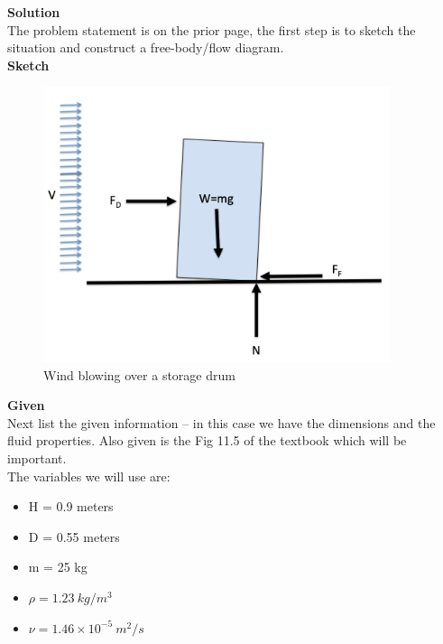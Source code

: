 \documentclass[12pt]{article}
\begin{document}
\clearpage
\textbf{Solution}\\
The problem statement is on the prior page, the first step is to sketch the situation and construct a free-body/flow diagram.\\
\textbf{Sketch}\\
\begin{figure}[h!] %
   \centering
   \includegraphics[width=4in]{Sketch.png} 
   \caption{Wind blowing over a storage drum}
   \label{fig:Sketch}
\end{figure}

\textbf{Given}\\
Next list the given information -- in this case we have the dimensions and the fluid properties.  Also given is the Fig 11.5 of the textbook which will be important.\\
The variables we will use are:
\begin{itemize}
\item H = 0.9 meters
\item D = 0.55 meters
\item m = 25 kg
\item  $\rho = 1.23~kg/m^3$
\item $\nu = 1.46 \times 10^{-5}~m^2/s$
\end{itemize}
\end{document}
